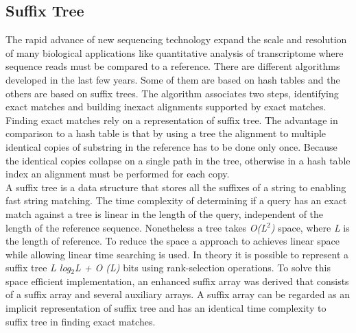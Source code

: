 \documentclass[12pt, a4paper]{report}
\begin{document}
\subsection{Suffix Tree}
The rapid advance of new sequencing technology expand the scale and resolution of many biological applications like quantitative analysis of transcriptome where sequence reads must be compared to a reference. There are different algorithms developed in the last few years. Some of them are based on hash tables and the others are based on suffix trees. The algorithm associates two steps, identifying exact matches and building inexact alignments supported by exact matches. Finding exact matches rely on a representation of suffix tree. 
The advantage in comparison to a hash table is that by using a tree the alignment to multiple identical copies of substring in the reference has to be done only once. Because the identical copies collapse on a single path in the tree, otherwise in a hash table index an alignment must be performed for each copy. \cite{Li2010} \\
A suffix tree is a data structure that stores all the suffixes of a string to enabling fast string matching. The time complexity of determining if a query has an exact match against a tree is linear in the length of the query, independent of the length of the reference sequence. Nonetheless a tree takes \textit{O(L$^2$)} space, where \textit{L} is the length of reference. To reduce the space a approach to achieves linear space while allowing linear time searching is used. In theory it is possible to represent a suffix tree \textit{L log$_2$L + O (L)} bits using rank-selection operations. To solve this space efficient implementation,  an enhanced suffix array was derived that consists of a suffix array and several auxiliary arrays. A suffix array can be regarded as an implicit representation of suffix tree and has an identical time complexity to suffix tree in finding exact matches. \cite{Li2010}

\end{document}
